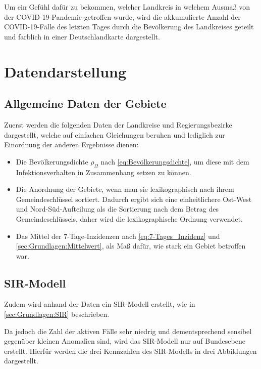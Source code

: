 Um ein Gefühl dafür zu bekommen, welcher Landkreis in welchem Ausmaß von der COVID-19-Pandemie getroffen wurde, wird die akkumulierte Anzahl der COVID-19-Fälle des letzten Tages durch die Bevölkerung des Landkreises geteilt und farblich in einer Deutschlandkarte dargestellt.
%
\section{Datendarstellung}\label{sec:Vorgehensweise:Datendarstellung}
\subsection{Allgemeine Daten der Gebiete}\label{sec:Vorgehensweise:Datendarstellung:Allgemeine Daten der Gebiete}
Zuerst werden die folgenden Daten der Landkreise und Regierungsbezirke dargestellt, welche auf einfachen Gleichungen beruhen und lediglich zur Einordnung der anderen Ergebnisse dienen:
\begin{itemize}
    \item Die Bevölkerungsdichte $\rho_\Omega$ nach \autoref{eq:Bevölkerungsdichte}, um diese mit dem Infektionsverhalten in Zusammenhang setzen zu können.
    \item Die Anordnung der Gebiete, wenn man sie lexikographisch nach ihrem Gemeindeschlüssel sortiert. Dadurch ergibt sich eine einheitlichere Ost-West und Nord-Süd-Aufteilung als die Sortierung nach dem Betrag des Gemeindeschlüssels, daher wird die lexikographische Ordnung verwendet.
    \item Das Mittel der 7-Tage-Inzidenzen nach \autoref{eq:7-Tages_Inzidenz} und \autoref{sec:Grundlagen:Mittelwert}, als Maß dafür, wie stark ein Gebiet betroffen war.
\end{itemize}
\subsection{SIR-Modell}\label{sec:Vorgehensweise:SIR}
Zudem wird anhand der Daten ein SIR-Modell erstellt, wie in \autoref{sec:Grundlagen:SIR} beschrieben.

Da jedoch die Zahl der aktiven Fälle sehr niedrig und dementsprechend sensibel gegenüber kleinen Anomalien sind, wird das SIR-Modell nur auf Bundesebene erstellt. 
Hierfür werden die drei Kennzahlen des SIR-Modells in drei Abbildungen dargestellt.
